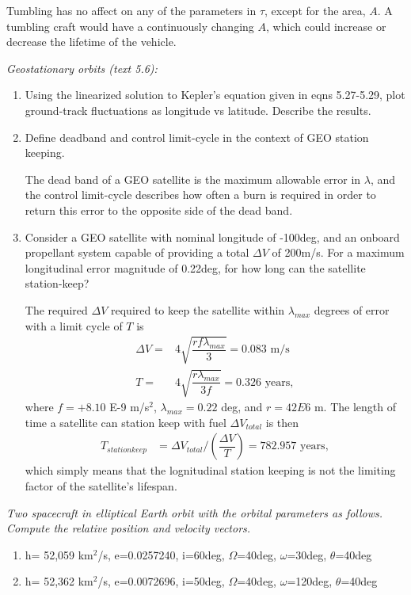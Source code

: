 \documentclass[onecolumn,10pt]{jhwhw}
\begin{document}
Tumbling has no affect on any of the parameters in $\tau$, except for the area, $A$. A tumbling craft would have a continuously changing $A$, which could increase or decrease the lifetime of the vehicle.
\clearpage

\problem{}
\textit{Geostationary orbits (text 5.6):}
\begin{enumerate}
\itemsep0em
\item Using the linearized solution to Kepler’s equation given in eqns 5.27-5.29, plot ground-track fluctuations as longitude vs latitude. Describe the results.
\item Define deadband and control limit-cycle in the context of GEO station keeping.

The dead band of a GEO satellite is the maximum allowable error in $\lambda$, and the control limit-cycle describes how often a burn is required in order to return this error to the opposite side of the dead band.

\item Consider a GEO satellite with nominal longitude of -100deg, and an onboard propellant system capable of providing a total $\Delta V$ of 200m/s. For a maximum longitudinal error magnitude of 0.22deg, for how long can the satellite station-keep?

The required $\Delta V$ required to keep the satellite within $\lambda_{max}$ degrees of error with a limit cycle of $T$ is
\begin{align*}
\Delta V =& 4 \sqrt{\dfrac{rf \lambda_{max}}{3}} = 0.083 \mbox{ m/s}\\
       T =& 4 \sqrt{\dfrac{r \lambda_{max}}{3f}} = 0.326 \mbox{ years},
\end{align*}
where $f = +8.10$ E-9 m/s$^2$, $\lambda_{max} = 0.22$ deg, and $r = 42E6$ m. The length of time a satellite can station keep with fuel $\Delta V_{total}$ is then
\begin{align*}
T_{station keep} &= \Delta V_{total} / \left( \dfrac{\Delta V}{T} \right) = 782.957 \mbox{ years},
\end{align*}
which simply means that the lognitudinal station keeping is not the limiting factor of the satellite's lifespan.
\end{enumerate}
\clearpage

\problem{}
\textit{Two spacecraft in elliptical Earth orbit with the orbital parameters as follows. Compute the relative position and velocity vectors.}
\begin{enumerate}
\itemsep0em
\item h= 52,059 km$^2$/s, e=0.0257240, i=60deg, $\Omega$=40deg, $\omega$=30deg, $\theta$=40deg
\item h= 52,362 km$^2$/s, e=0.0072696, i=50deg, $\Omega$=40deg, $\omega$=120deg, $\theta$=40deg
\end{enumerate}
\end{document}
